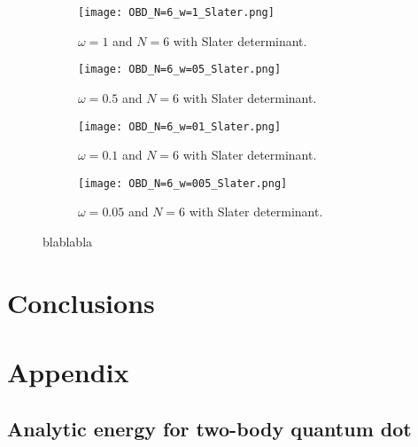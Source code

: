 \documentclass[english, a4paper]{article}
\begin{document}
\begin{figure}[H]
\begin{center}
\begin{subfigure}{.4\textwidth}
  \centering
  \texttt{[image: OBD\_N=6\_w=1\_Slater.png]}
  \caption{$\omega = 1$ and $N = 6$ with Slater determinant.}
  \label{fig:NAVN1}
\end{subfigure}
\begin{subfigure}{.4\textwidth}
  \centering
  \texttt{[image: OBD\_N=6\_w=05\_Slater.png]}
  \caption{$\omega = 0.5$ and $N = 6$ with Slater determinant.}
  \label{fig:NAVN2}
\end{subfigure}
\vspace{1cm}
\begin{subfigure}{.4\textwidth}
  \centering
  \texttt{[image: OBD\_N=6\_w=01\_Slater.png]}
  \caption{$\omega = 0.1$ and $N = 6$ with Slater determinant.}
  \label{fig:NAVN3}
\end{subfigure}
   \begin{subfigure}{.4\textwidth}
  \centering
  \texttt{[image: OBD\_N=6\_w=005\_Slater.png]}
  \caption{$\omega = 0.05$ and $N = 6$ with Slater determinant.}
  \label{fig:NAVN4}
\end{subfigure}
\vspace{1cm}
    \label{WithoutSlater}
  \end{center}
  \caption{blablabla}
\end{figure}


\section{Conclusions}
 




\section{Appendix}

\subsection{Analytic energy for two-body quantum dot}
\end{document}
